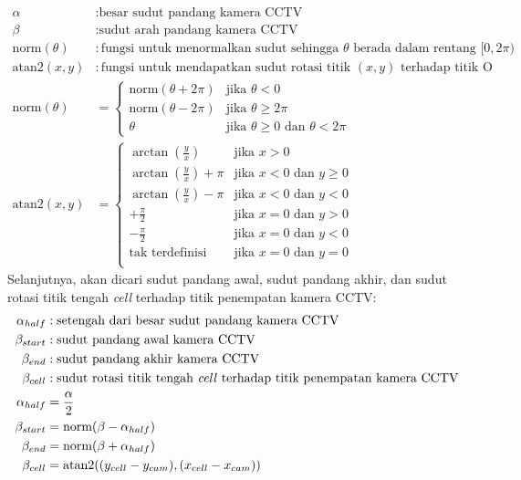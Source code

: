 \begin{equation}
	\begin{split}
		\alpha &: \text{besar sudut pandang kamera CCTV}\\
		\beta &: \text{sudut arah pandang kamera CCTV}\\
		\text{norm}(\theta) &: \text{fungsi untuk menormalkan sudut sehingga } \theta \text{ berada dalam rentang }[0,2\pi)\\
		\text{atan2}(x,y) &: \text{fungsi untuk mendapatkan sudut rotasi titik } (x,y) \text{ terhadap titik O}\\
		\text{norm}(\theta) &=
		\left\{
			\begin{array}{ll}
				\text{norm}(\theta + 2\pi) & \text{jika } \theta < 0\\
				\text{norm}(\theta - 2\pi) & \text{jika } \theta \geq 2\pi\\
				\theta & \text{jika } \theta \geq 0 \text{ dan } \theta < 2\pi
			\end{array}
		\right.\\
		\text{atan2}(x,y) &=
		\left \{
			\begin{array}{ll}
				\arctan\left(\frac{y}{x}\right) & \text{jika } x>0\\
				\arctan\left(\frac{y}{x}\right)+\pi & \text{jika } x<0 \text{ dan } y\geq0\\
				\arctan\left(\frac{y}{x}\right)-\pi & \text{jika } x<0 \text{ dan } y<0\\
				+\frac{\pi}{2} & \text{jika } x=0 \text{ dan } y>0\\
				-\frac{\pi}{2} & \text{jika } x=0 \text{ dan } y<0\\
				\text{tak terdefinisi} & \text{jika } x=0 \text{ dan } y=0\\
			\end{array}
		\right.
	\end{split}
\end{equation}
Selanjutnya, akan dicari sudut pandang awal, sudut pandang akhir, dan sudut rotasi titik tengah \textit{cell} terhadap titik penempatan kamera CCTV:
\begin{equation}
	\begin{split}
		\alpha_{half} &: \text{setengah dari besar sudut pandang kamera CCTV}\\
		\beta_{start} &: \text{sudut pandang awal kamera CCTV}\\
		\beta_{end} &: \text{sudut pandang akhir kamera CCTV}\\
		\beta_{cell} &: \text{sudut rotasi titik tengah \textit{cell} terhadap titik penempatan kamera CCTV}\\
		\alpha_{half} &= \frac{\alpha}{2}\\
		\beta_{start} &= \text{norm}(\beta - \alpha_{half})\\
		\beta_{end} &= \text{norm}(\beta + \alpha_{half})\\
		\beta_{cell} &= \text{atan2}((y_{cell}-y_{cam}),(x_{cell}-x_{cam}))
	\end{split}
\end{equation}
